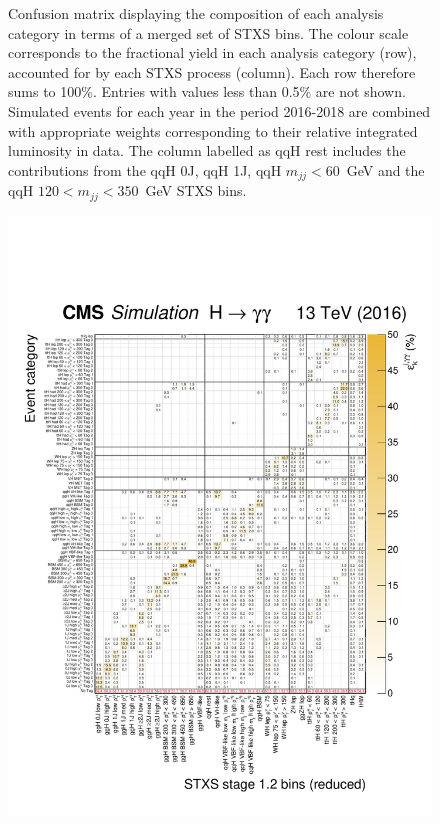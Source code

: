 \begin{figure}[hptb]
  {
    Confusion matrix displaying the composition of each analysis category in terms of a merged set of STXS bins. The colour scale corresponds to the fractional yield in each analysis category (row), accounted for by each STXS process (column). Each row therefore sums to 100\%. Entries with values less than 0.5\% are not shown. Simulated events for each year in the period 2016-2018 are combined with appropriate weights corresponding to their relative integrated luminosity in data. The column labelled as qqH rest includes the contributions from the qqH 0J, qqH 1J, qqH $m_{jj}<60$~GeV and the qqH $120<m_{jj}<350$~GeV STXS bins.
  }
  \label{fig:purity_matrix_full}
\end{figure}

\begin{figure}[hptb]
  \centering
  \includegraphics[width=1\textwidth]{Figures/app_matrices/migrationMatrix_2016_thesis.pdf}

\end{figure}

